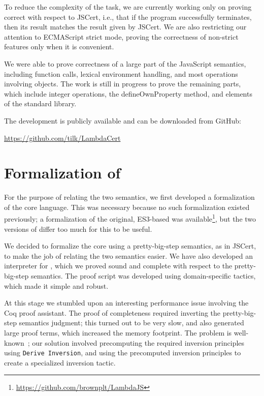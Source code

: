 \documentclass{llncs}
\begin{document}
To reduce the complexity of the task, we are currently working
only on proving \lambdajs{} correct with respect to JSCert,
i.e., that if the \lambdajs{} program successfully terminates,
then its result matches the result given by JSCert. We are also
restricting our attention to ECMAScript strict mode, proving the
correctness of non-strict features only when it is convenient.

We were able to prove correctness of a large part of the
JavaScript semantics, including function calls, lexical environment
handling, and most operations involving objects. The work is still
in progress to prove the remaining parts, which include integer
operations, the
defineOwnProperty method, and elements of the standard library.

The development is publicly available and can be downloaded from GitHub:

\url{https://github.com/tilk/LambdaCert}

\section{Formalization of \lambdajs{}}

For the purpose of relating the two semantics, we first
developed a formalization of the \lambdajs{} core language.
This was necessary because no such formalization existed previously;
a formalization of the original, ES3-based \lambdajs{}
was available\footnote{\url{https://github.com/brownplt/LambdaJS}},
but the two versions of \lambdajs{} differ too much for this
to be useful.

We decided to formalize the \lambdajs{} core using a
pretty-big-step semantics, as in JSCert, to make the job of
relating the two semantics easier. We have also developed
an interpreter for \lambdajs{}, which we proved sound and
complete with respect to the pretty-big-step semantics.
The proof script was developed using domain-specific tactics,
which made it simple and robust.

At this stage we stumbled upon an interesting performance issue 
involving the Coq proof assistant. The proof of completeness required
inverting the pretty-big-step semantics judgment; this turned out
to be very slow, and also generated large proof terms, which increased
the memory footprint. The problem is well-known~\cite{Monin:Coq2}; 
our solution involved
precomputing the required inversion principles using
\texttt{Derive Inversion}, and using the precomputed inversion
principles to create a specialized inversion tactic.
\end{document}
